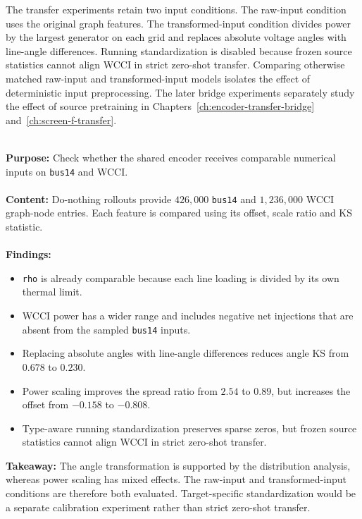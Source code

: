 The transfer experiments retain two input conditions. The raw-input condition
uses the original graph features. The transformed-input condition divides power
by the largest generator on each grid and replaces absolute voltage angles with
line-angle differences. Running standardization is disabled because frozen
source statistics cannot align WCCI in strict zero-shot transfer. Comparing
otherwise matched raw-input and transformed-input models isolates the effect of
deterministic input preprocessing. The later bridge experiments separately
study the effect of source pretraining in
Chapters~\ref{ch:encoder-transfer-bridge} and~\ref{ch:screen-f-transfer}.
\\
\\
\begin{tcolorbox}[
  colframe=red!75!black,
  colback=red!5!white,
  title=Chapter 8 Summary: Cross-Grid Input Compatibility and Scaling]
\textbf{Purpose:} Check whether the shared encoder receives
comparable numerical inputs on \texttt{bus14} and WCCI.
\\
\\
\textbf{Content:} Do-nothing rollouts provide $426{,}000$
\texttt{bus14} and $1{,}236{,}000$ WCCI graph-node entries. Each feature is
compared using its offset, scale ratio and KS statistic.
\\
\\
\textbf{Findings:}
\begin{itemize}
  \item \texttt{rho} is already comparable because each line
  loading is divided by its own thermal limit.
  \item WCCI power has a wider range and includes negative net
  injections that are absent from the sampled \texttt{bus14} inputs.
  \item Replacing absolute angles with line-angle differences
  reduces angle KS from $0.678$ to $0.230$.
  \item Power scaling improves the spread ratio from $2.54$ to
  $0.89$, but increases the offset from $-0.158$ to $-0.808$.
  \item Type-aware running standardization preserves sparse
  zeros, but frozen source statistics cannot align WCCI in strict zero-shot
  transfer.
\end{itemize}
\textbf{Takeaway:} The angle transformation is supported by the
distribution analysis, whereas power scaling has mixed effects. The raw-input
and transformed-input conditions are therefore both evaluated. Target-specific
standardization would be a separate calibration experiment rather than strict
zero-shot transfer.
\end{tcolorbox}
